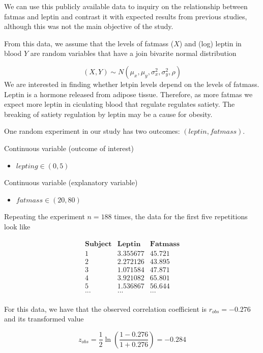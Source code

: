 \documentclass[
]{book}
\providecommand{\tightlist}{%
  \setlength{\itemsep}{0pt}\setlength{\parskip}{0pt}}
\begin{document}
We can use this publicly available data to inquiry on the relationship between fatmas and leptin and contrast it with expected results from previous studies, although this was not the main objective of the study.

From this data, we assume that the levels of fatmass (\(X\)) and (log) leptin in blood \(Y\) are random variables that have a join bivarite normal distribution

\[(X, Y) \sim N(\mu_x, \mu_y, \sigma_x^2, \sigma_y^2, \rho)\]
We are interested in finding whether letpin levels depend on the levels of fatmass. Leptin is a hormone released from adipose tissue. Therefore, as more fatmas we expect more leptin in ciculating blood that regulate regulates satiety. The breaking of satiety regulation by leptin may be a cause for obesity.

One random experiment in our study has two outcomes: \((leptin, fatmass)\).

Continuous variable (outcome of interest)

\begin{itemize}
\tightlist
\item
  \(lepting \in (0, 5)\)
\end{itemize}

Continuous variable (explanatory variable)

\begin{itemize}
\tightlist
\item
  \(fatmass \in (20,80)\)
\end{itemize}

Repeating the experiment \(n=188\) times, the data for the first five repetitions look like

\[
  \begin{array}{ccc}
  \mathbf{Subject} & \mathbf{Leptin} & \mathbf{Fatmass} \\ 
1 & 3.355677  & 45.721 \\ 
2 & 2.272126  & 43.895 \\ 
3 & 1.071584  & 47.871 \\ 
4 & 3.921082  & 65.801 \\ 
5 & 1.536867  & 56.644 \\ 
... & ...  & ... \\ 
 \end{array}
\]

For this data, we have that the observed correlation coefficient is \(r_{obs}=-0.276\) and its transformed value

\[z_{obs}=\frac{1}{2}\ln(\frac{1-0.276}{1+0.276})=-0.284\]
\end{document}
